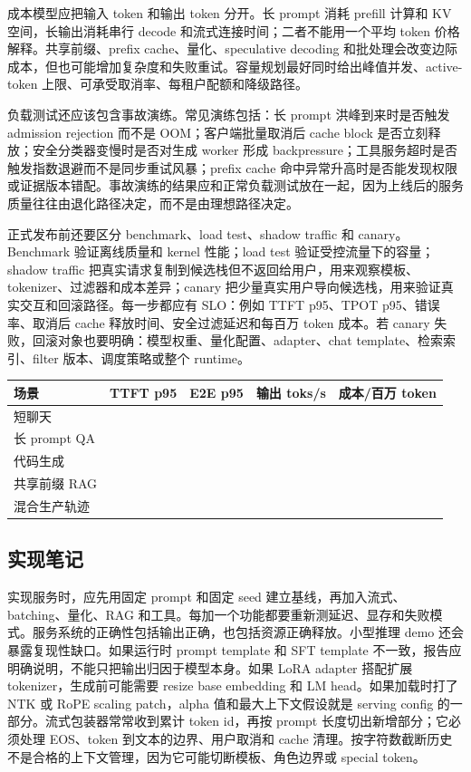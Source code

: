 \documentclass[UTF8,zihao=-4,openany]{ctexbook}
\begin{document}
成本模型应把输入 token 和输出 token 分开。长 prompt 消耗 prefill 计算和 KV 空间，长输出消耗串行 decode 和流式连接时间；二者不能用一个平均 token 价格解释。共享前缀、prefix cache、量化、speculative decoding 和批处理会改变边际成本，但也可能增加复杂度和失败重试。容量规划最好同时给出峰值并发、active-token 上限、可承受取消率、每租户配额和降级路径。

负载测试还应该包含事故演练。常见演练包括：长 prompt 洪峰到来时是否触发 admission rejection 而不是 OOM；客户端批量取消后 cache block 是否立刻释放；安全分类器变慢时是否对生成 worker 形成 backpressure；工具服务超时是否触发指数退避而不是同步重试风暴；prefix cache 命中异常升高时是否能发现权限或证据版本错配。事故演练的结果应和正常负载测试放在一起，因为上线后的服务质量往往由退化路径决定，而不是由理想路径决定。

正式发布前还要区分 benchmark、load test、shadow traffic 和 canary。Benchmark 验证离线质量和 kernel 性能；load test 验证受控流量下的容量；shadow traffic 把真实请求复制到候选栈但不返回给用户，用来观察模板、tokenizer、过滤器和成本差异；canary 把少量真实用户导向候选栈，用来验证真实交互和回滚路径。每一步都应有 SLO：例如 TTFT p95、TPOT p95、错误率、取消后 cache 释放时间、安全过滤延迟和每百万 token 成本。若 canary 失败，回滚对象也要明确：模型权重、量化配置、adapter、chat template、检索索引、filter 版本、调度策略或整个 runtime。

\begin{center}
\small
\setlength{\tabcolsep}{3pt}
\begin{tabular}{@{}p{}p{}p{}p{}p{}@{}}
\toprule
场景 & TTFT p95 & E2E p95 & 输出 toks/s & 成本/百万 token \\
\midrule
短聊天 &  &  &  &  \\
长 prompt QA &  &  &  &  \\
代码生成 &  &  &  &  \\
共享前缀 RAG &  &  &  &  \\
混合生产轨迹 &  &  &  &  \\
\bottomrule
\end{tabular}
\end{center}

\subsection{实现笔记}
实现服务时，应先用固定 prompt 和固定 seed 建立基线，再加入流式、batching、量化、RAG 和工具。每加一个功能都要重新测延迟、显存和失败模式。服务系统的正确性包括输出正确，也包括资源正确释放。小型推理 demo 还会暴露复现性缺口。如果运行时 prompt template 和 SFT template 不一致，报告应明确说明，不能只把输出归因于模型本身。如果 LoRA adapter 搭配扩展 tokenizer，生成前可能需要 resize base embedding 和 LM head。如果加载时打了 NTK 或 RoPE scaling patch，alpha 值和最大上下文假设就是 serving config 的一部分。流式包装器常常收到累计 token id，再按 prompt 长度切出新增部分；它必须处理 EOS、token 到文本的边界、用户取消和 cache 清理。按字符数截断历史不是合格的上下文管理，因为它可能切断模板、角色边界或 special token。
\end{document}
